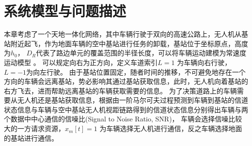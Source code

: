 \section{系统模型与问题描述}\label{section4-2}
本章考虑了一个天地一体化网络，其中车辆行驶于双向的高速公路上，无人机从基站附近起飞，作为地面车辆的空中基站进行任务的卸载，基站位于坐标原点，高度为$h_0$，
$D_R$代表了路边单元的覆盖范围的半径长度，可以将车辆运动建模为常速度运动模型 \supercite{COIFMAN1998271}。 可以规定向右为正方向，定义车道索引$L=1$ 为车辆向右行驶，$L=-1$为向左行驶。  %
由于基站位置固定，随者时间的推移，不可避免地存在一个方向的车辆会远离基站，势必影响其通过基站获取信息，此时，无人机向着基站的右方飞去，进而帮助远离基站的车辆获取需要的信息。
为了决策道路上的车辆需要从无人机还是基站获取信息，根据由一阶马尔可夫过程预测到车辆到基站的信道状态信息与车辆与空中基站无人机视距链路得到的信道状态信息分别得出车辆与两个数据中中心通信的信噪比(Signal to Noise Ratio, SNR)，
车辆会选择信噪比较大的一方请求资源，$x_m\left[t\right]=1$ 为车辆选择无人机进行通信，反之车辆选择地面的基站进行通信。

